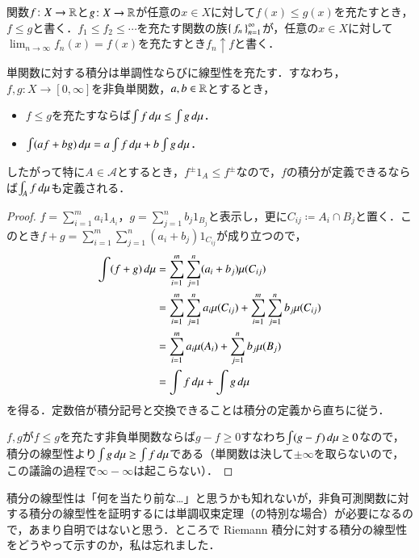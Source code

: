 \begin{defi}
関数$f \colon X \to \mathbb{R}$と$g \colon X \to \mathbb{R}$が任意の$x \in X$に対して$f(x) \leq g(x)$を充たすとき，$f \leq g$と書く．$f_1 \leq f_2 \leq \dotsb$を充たす関数の族$\set{f_n}_{n=1}^\infty$が，任意の$x \in X$に対して$\lim_{n\to\infty} f_n(x) = f(x)$を充たすとき$f_n \uparrow f$と書く．
\end{defi}

\begin{lem}
単関数に対する積分は単調性ならびに線型性を充たす．すなわち，$f,g \colon X \to [0,\infty]$を非負単関数，$a,b\in \mathbb{R}$とするとき，
\begin{itemize}
\item $f \leq g$を充たすならば$\int f \mathop{}\!d \mu \leq \int g \mathop{}\!d \mu$．
\item $\int (af+bg) \mathop{}\!d\mu = a\int f \mathop{}\!d \mu + b\int g \mathop{}\!d \mu$．
\end{itemize}
したがって特に$A \in \mathcal{A}$とするとき，$f^{\pm} 1_A \leq f^{\pm}$なので，$f$の積分が定義できるならば$\int_A f \mathop{}\!d\mu$も定義される．
\end{lem}

\begin{proof}
$f = \sum_{i=1}^m a_i 1_{A_i}$，$g = \sum_{j=1}^n b_j 1_{B_j}$と表示し，更に$C_{ij} \coloneqq A_i \cap B_j$と置く．このとき$f+g = \sum_{i=1}^m \sum_{j=1}^n (a_i+b_j)1_{C_{ij}}$が成り立つので，
\begin{align}
\int (f+g) \mathop{}\!d \mu &= \sum_{i=1}^m \sum_{j=1}^n (a_i + b_j) \mu(C_{ij}) \\
&= \sum_{i=1}^m \sum_{j=1}^n a_i \mu(C_{ij}) +  \sum_{i=1}^m \sum_{j=1}^n b_j \mu(C_{ij}) \\
&= \sum_{i=1}^m a_i \mu(A_i) + \sum_{j=1}^n b_j \mu(B_j) \\
&= \int f \mathop{}\!d \mu + \int g \mathop{}\!d \mu
\end{align}を得る．定数倍が積分記号と交換できることは積分の定義から直ちに従う．

$f,g$が$f \leq g$を充たす非負単関数ならば$g -f \geq 0$すなわち$\int (g-f) \mathop{}\!d\mu \geq 0$なので，積分の線型性より$\int g \mathop{}\!d \mu \geq \int f \mathop{}\!d \mu$である（単関数は決して$\pm \infty$を取らないので，この議論の過程で$\infty - \infty$は起こらない）．
\end{proof}

\begin{dig}
積分の線型性は「何を当たり前な…」と思うかも知れないが，非負可測関数に対する積分の線型性を証明するには単調収束定理（の特別な場合）が必要になるので，あまり自明ではないと思う．ところで Riemann 積分に対する積分の線型性をどうやって示すのか，私は忘れました．
\end{dig}


